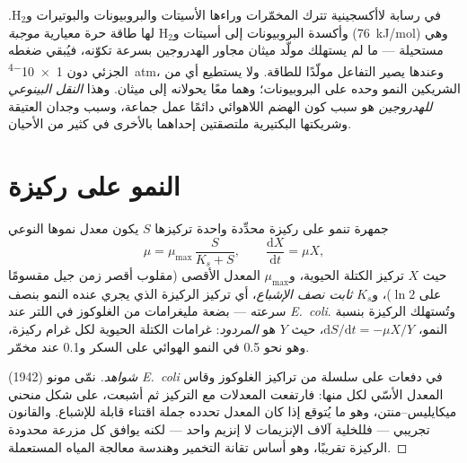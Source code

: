 \begin{example}\label{ex:b2:microbial-metabolism:syntrophy}
في رسابة لاأكسجينية تترك المخمّرات وراءها الأسيتات والبروبيونات
والبوتيرات و$\mathrm{H_2}$. وأكسدة البروبيونات إلى أسيتات
و$\mathrm{H_2}$ لها طاقة حرة معيارية \emph{موجبة}
(\qty{+76}{kJ/mol}) وهي مستحيلة --- ما لم يستهلك مولّد ميثان مجاور
الهدروجين بسرعة تكوّنه، فيُبقي ضغطه الجزئي دون \qty{1e-4}{atm}،
وعندها يصير التفاعل مولّدًا للطاقة. ولا يستطيع أي من الشريكين النمو
وحده على البروبيونات؛ وهما معًا يحولانه إلى ميثان. وهذا
\emph{النقل البينوعي للهدروجين} هو سبب كون الهضم اللاهوائي دائمًا
عمل جماعة، وسبب وجدان العتيقة وشريكتها البكتيرية ملتصقتين إحداهما
بالأخرى في كثير من الأحيان.
\end{example}

\section{النمو على ركيزة}

\begin{theorem}\label{thm:b2:microbial-metabolism:monod}
جمهرة تنمو على ركيزة محدِّدة واحدة تركيزها $S$ يكون معدل نموها
النوعي
\[
\mu = \mu_{\max}\,\frac{S}{K_s + S}, \qquad \frac{\mathrm{d}X}{\mathrm{d}t} = \mu X,
\]
حيث $X$ تركيز الكتلة الحيوية، و$\mu_{\max}$ المعدل الأقصى (مقلوب
أقصر زمن جيل مقسومًا على $\ln 2$)، و$K_s$ \emph{ثابت نصف الإشباع}،
أي تركيز الركيزة الذي يجري عنده النمو بنصف سرعته --- بضعة
مليغرامات من الغلوكوز في اللتر عند \emph{E.~coli}. وتُستهلك الركيزة
بنسبة النمو، $\mathrm{d}S/\mathrm{d}t =
-\mu X/Y$، حيث $Y$ هو \emph{المردود}: غرامات الكتلة الحيوية لكل غرام
ركيزة، وهو نحو \num{0.5} في النمو الهوائي على السكر و\num{0.1} عند
مخمّر.
\end{theorem}
\begin{proof}[شواهد]
نمّى مونو (1942) \emph{E.~coli} في دفعات على سلسلة من تراكيز
الغلوكوز وقاس المعدل الأسّي لكل منها: فارتفعت المعدلات مع التركيز
ثم أشبعت، على شكل منحني ميكايليس--منتن، وهو ما يُتوقع إذا كان
المعدل تحدده جملة اقتناء قابلة للإشباع. والقانون تجريبي --- فللخلية
آلاف الإنزيمات لا إنزيم واحد --- لكنه يوافق كل مزرعة محدودة الركيزة
تقريبًا، وهو أساس تقانة التخمير وهندسة معالجة المياه المستعملة.
\end{proof}

